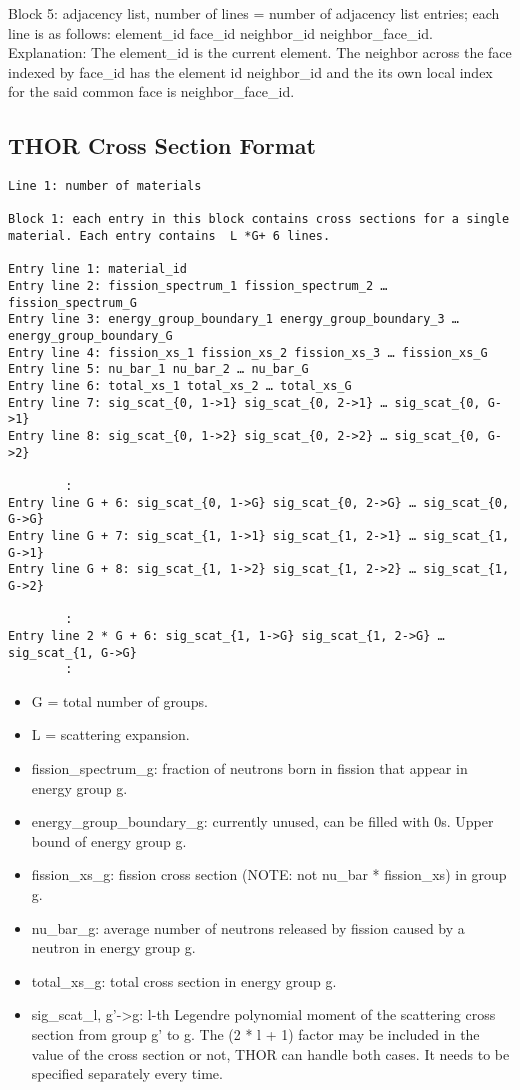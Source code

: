 \noindent Block 5: adjacency list, number of lines = number of adjacency list entries; each line is as follows: element\_id face\_id neighbor\_id neighbor\_face\_id.
Explanation: The element\_id is the current element. The neighbor across the face indexed by face\_id has the element id neighbor\_id and the its own local index for the said common face is neighbor\_face\_id.

\subsection{THOR Cross Section Format}\label{sec:cross_section_format}
\begin{verbatim}
Line 1: number of materials

Block 1: each entry in this block contains cross sections for a single material. Each entry contains  L *G+ 6 lines. 

Entry line 1: material_id
Entry line 2: fission_spectrum_1 fission_spectrum_2 … fission_spectrum_G
Entry line 3: energy_group_boundary_1 energy_group_boundary_3 … energy_group_boundary_G
Entry line 4: fission_xs_1 fission_xs_2 fission_xs_3 … fission_xs_G
Entry line 5: nu_bar_1 nu_bar_2 … nu_bar_G
Entry line 6: total_xs_1 total_xs_2 … total_xs_G
Entry line 7: sig_scat_{0, 1->1} sig_scat_{0, 2->1} … sig_scat_{0, G->1}
Entry line 8: sig_scat_{0, 1->2} sig_scat_{0, 2->2} … sig_scat_{0, G->2}

        :
Entry line G + 6: sig_scat_{0, 1->G} sig_scat_{0, 2->G} … sig_scat_{0, G->G}
Entry line G + 7: sig_scat_{1, 1->1} sig_scat_{1, 2->1} … sig_scat_{1, G->1}
Entry line G + 8: sig_scat_{1, 1->2} sig_scat_{1, 2->2} … sig_scat_{1, G->2}

        :
Entry line 2 * G + 6: sig_scat_{1, 1->G} sig_scat_{1, 2->G} … sig_scat_{1, G->G}
        :

\end{verbatim}

\begin{itemize}
\item G = total number of groups.
\item L = scattering expansion.
\item fission\_spectrum\_g: fraction of neutrons born in fission that appear in energy group g.
\item energy\_group\_boundary\_g: currently unused, can be filled with 0s. Upper bound of energy group g.
\item fission\_xs\_g: fission cross section (NOTE: not nu\_bar * fission\_xs) in group g.
\item nu\_bar\_g: average number of neutrons released by fission caused by a neutron in energy group g.
\item total\_xs\_g: total cross section in energy group g.
\item sig\_scat\_{l, g’->g}: l-th Legendre polynomial moment of the scattering cross section from group g’ to g. The (2 * l + 1) factor may be included in the value of the cross section or not, THOR can handle both cases. It needs to be specified separately every time.
\end{itemize}




